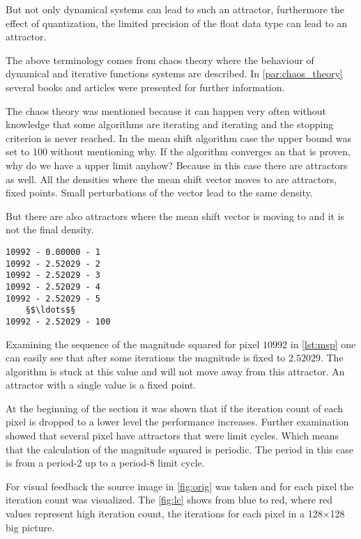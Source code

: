 But not only dynamical systems can lead to such an attractor, furthermore the 
effect of quantization, the limited precision of the float data type can lead to
an attractor. 

The above terminology comes from chaos theory where the behaviour of dynamical
and iterative functions systems are described. In \autoref{par:chaos_theory} 
several books and articles were presented for further information. 

The chaos theory was mentioned because it can happen very often without knowledge
that some algorithms are iterating and iterating and the stopping criterion is never
reached. In the mean shift algorithm case the upper bound was set to 100 without
mentioning why. If the algorithm converges an that is proven, why do we have a 
upper limit anyhow? Because in this case there are attractors as well. All the 
densities where the mean shift vector moves to are attractors, fixed points.
Small perturbations of the vector lead to the same density. 

But there are also attractors where the mean shift vector is moving to and it is
not the final density. 

\begin{lstlisting}[caption=Magnitude squared of pixel 10992, label=lst:msp]
10992 - 0.00000 - 1
10992 - 2.52029 - 2
10992 - 2.52029 - 3
10992 - 2.52029 - 4
10992 - 2.52029 - 5
	§$\ldots$§
10992 - 2.52029 - 100
\end{lstlisting}
Examining the sequence of the magnitude squared for pixel $10992$ in
\autoref{lst:msp} one can easily see that after some iterations the magnitude is
fixed to $2.52029$. The algorithm is stuck at this value and will not move away
from this attractor. An attractor with a single value is a fixed point. 

At the beginning of the section it was shown that if the iteration count of each
pixel is dropped to a lower level the performance increases. Further examination
showed that several pixel have attractors that were limit cycles. Which means that
the calculation of the magnitude squared is periodic. The period in this case
is from a period-2 up to a period-8 limit cycle.

For visual feedback the source image in \autoref{fig:orig} was taken and for
each pixel the iteration count was visualized. The \autoref{fig:lc} shows
from blue to red, where red values represent high iteration count, the iterations
for each pixel in a 128$\times$128 big picture.

